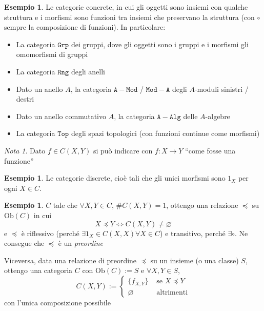\documentclass[notitlepage]{report}
\newcounter{theo}[section]\setcounter{theo}{0}
\newcounter{excounter}[section]\setcounter{excounter}{0}
\numberwithin{equation}{section}
\theoremstyle{plain}
\theoremstyle{definition}
\newtheorem{example}[excounter]{Esempio}
\theoremstyle{remark}
\newtheorem*{note}{Nota}
\begin{document}
\begin{example}{}
    Le categorie concrete, in cui gli oggetti sono insiemi con qualche struttura
    e i morfismi sono funzioni tra insiemi che preservano la struttura (con \(\circ\) sempre la composizione di funzioni). In particolare:
\begin{itemize}
    \item La categoria \(\mathtt{Grp}\) dei gruppi, dove gli oggetti sono i
        gruppi e i morfismi gli omomorfismi di gruppi
    \item La categoria \(\mathtt{Rng}\) degli anelli
    \item Dato un anello \(A\), la categoria \(\mathtt{A-Mod}\) / \(\mathtt{Mod-A}\) degli \(A\)-moduli sinistri / destri
    \item Dato un anello commutativo \(A\), la categoria \(\mathtt{A-Alg}\)
        delle \(A\)-algebre
    \item La categoria \(\mathtt{Top}\) degli spazi topologici (con funzioni
        continue come morfismi)
\end{itemize}
\end{example}
\begin{note}{}
    Dato \(f \in C{(X, Y)}\) si può indicare con \(f : X \to Y\) ``come fosse
    una funzione''
\end{note}

\begin{example}{}
    Le categorie discrete, cioè tali che gli unici morfismi sono \(1_X\) per
    ogni \(X \in C\).
\end{example}

\begin{example}{}
    \(C\) tale che \(\forall X, Y \in C\), \(\# C {(X, Y)} = 1\), ottengo
    una relazione \(\preccurlyeq \) su \(\mathrm{Ob}{(C)}\) in cui
    \[
      X \preccurlyeq Y \iff C{(X, Y)} \neq \varnothing
    \]
    e \(\preccurlyeq\)  è riflessivo (perché \(\exists  1_X \in C{(X, X)} \forall X \in C\)) e transitivo, perché \(\exists \circ\). Ne consegue che \(\preccurlyeq\) è un \emph{preordine}

    Viceversa, data una relazione di preordine \(\preccurlyeq\) su un insieme (o
    una classe) \(S\), ottengo una categoria \(C\) con \(\mathrm{Ob}{(C)} := S\) e \(\forall X, Y \in S\), 
    \[
      C{(X, Y)} := \begin{cases}{}
          \{f_{X,Y} \} & \text{ se } X \preccurlyeq Y \\
          \varnothing & \text{ altrimenti}
      \end{cases}
    \]
    con l'unica composizione possibile
\end{example}
\end{document}
